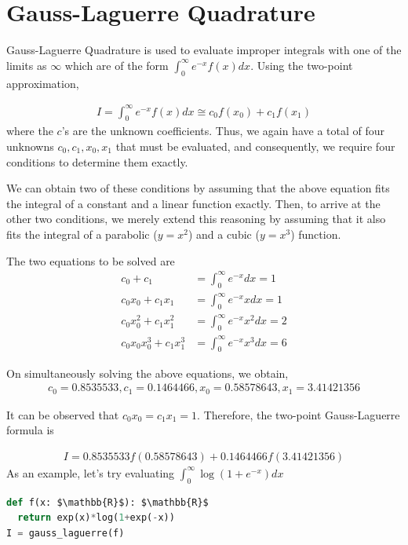 \documentclass[book.tex]{subfiles}
\begin{document}
\section{Gauss-Laguerre Quadrature}

Gauss-Laguerre Quadrature is used to evaluate improper integrals with one of the limits as $\infty$ which are of the form $\int_{0}^{\infty}e^{-x}f(x)dx$. Using the two-point approximation, 

\begin{align}
I = \int_{0}^{\infty}e^{-x}f(x)dx \cong c_0f(x_0) + c_1f(x_1)
\end{align} 
where the $c$’s are the unknown coefficients. Thus, we again have a total of four unknowns $c_0, c_1, x_0, x_1$ that must be evaluated, and consequently, we require four conditions to determine them exactly.

We can obtain two of these conditions by assuming that the above equation fits the integral of a constant and a linear function exactly. Then, to arrive at the other two conditions, we merely extend this reasoning by assuming that it also fits the integral of a parabolic ($y = x^2$) and a cubic ($y = x^3$) function.

The two equations to be solved are
\begin{align}
c_0 + c_1 &= \int_{0}^{\infty}e^{-x}dx = 1\\
c_0x_0 + c_1x_1 &= \int_{0}^{\infty}e^{-x}xdx = 1\\
c_0x_0^2 + c_1x_1^2 &= \int_{0}^{\infty}e^{-x}x^2dx = 2 \\	c_0x_0x_0^3 + c_1x_1^3 &= \int_{0}^{\infty}e^{-x}x^3dx = 6
\end{align}

On simultaneously solving the above equations, we obtain,
\begin{align}
c_0 = 0.8535533, c_1 = 0.1464466, x_0 = 0.58578643, x_1 = 3.41421356
\end{align}

It can be observed that $c_0x_0 = c_1x_1 = 1$. Therefore, the two-point Gauss-Laguerre formula is

\begin{align}
I = 0.8535533f(0.58578643) + 0.1464466f(3.41421356)
\end{align}
%
%
%
As an example, let's try
evaluating $ \int_{0}^{\infty}\log(1+e^{-x})dx$

\begin{lstlisting}[language=python]
def f(x: $\mathbb{R}$): $\mathbb{R}$  
  return exp(x)*log(1+exp(-x))
I = gauss_laguerre(f)
\end{lstlisting}
\end{document}
